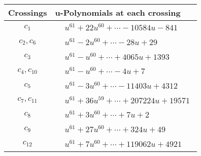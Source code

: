 \documentclass[1p]{elsarticle_modified}
\theoremstyle{definition}
\begin{document}
\begin{tabular}{m{50pt}|m{274pt}}
Crossings & \hspace{64pt}u-Polynomials at each crossing \\
\hline $$\begin{aligned}c_{1}\end{aligned}$$&$\begin{aligned}
&u^{61}+22 u^{60}+\cdots-10584 u-841
\end{aligned}$\\
\hline $$\begin{aligned}c_{2},c_{6}\end{aligned}$$&$\begin{aligned}
&u^{61}-2 u^{60}+\cdots-28 u+29
\end{aligned}$\\
\hline $$\begin{aligned}c_{3}\end{aligned}$$&$\begin{aligned}
&u^{61}- u^{60}+\cdots+4065 u+1393
\end{aligned}$\\
\hline $$\begin{aligned}c_{4},c_{10}\end{aligned}$$&$\begin{aligned}
&u^{61}- u^{60}+\cdots-4 u+7
\end{aligned}$\\
\hline $$\begin{aligned}c_{5}\end{aligned}$$&$\begin{aligned}
&u^{61}-3 u^{60}+\cdots-11403 u+4312
\end{aligned}$\\
\hline $$\begin{aligned}c_{7},c_{11}\end{aligned}$$&$\begin{aligned}
&u^{61}+36 u^{59}+\cdots+207224 u+19571
\end{aligned}$\\
\hline $$\begin{aligned}c_{8}\end{aligned}$$&$\begin{aligned}
&u^{61}+3 u^{60}+\cdots+7 u+2
\end{aligned}$\\
\hline $$\begin{aligned}c_{9}\end{aligned}$$&$\begin{aligned}
&u^{61}+27 u^{60}+\cdots+324 u+49
\end{aligned}$\\
\hline $$\begin{aligned}c_{12}\end{aligned}$$&$\begin{aligned}
&u^{61}+7 u^{60}+\cdots+119062 u+4921
\end{aligned}$\\
\hline
\end{tabular}\\~\\
\end{document}
